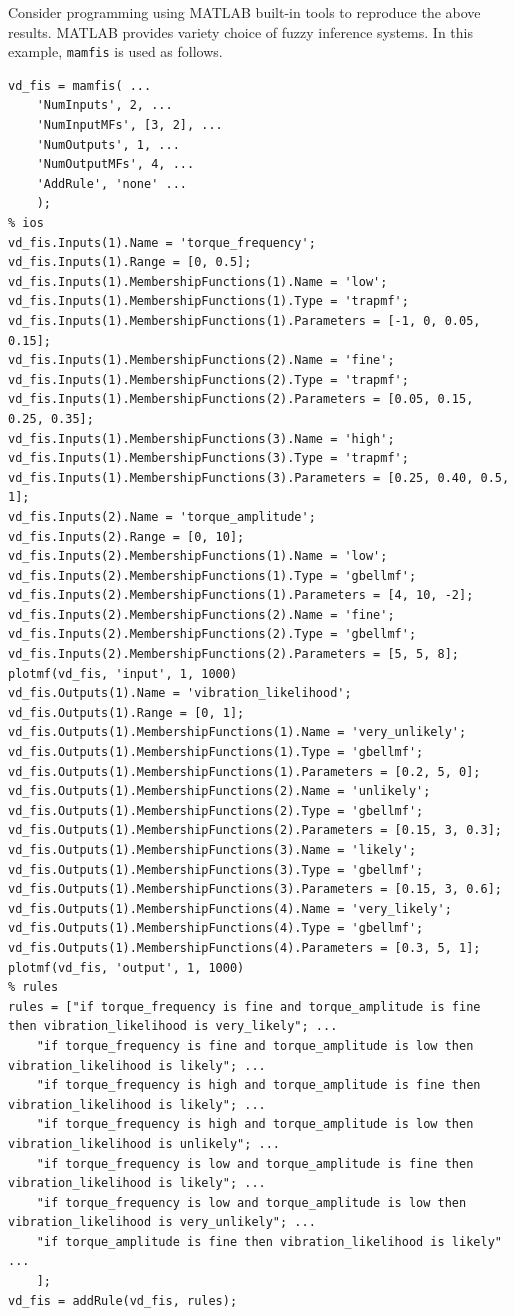 Consider programming using MATLAB built-in tools to reproduce the above results. MATLAB provides variety choice of fuzzy inference systems. In this example, \verb|mamfis| is used as follows.
\begin{lstlisting}
vd_fis = mamfis( ...
	'NumInputs', 2, ...
	'NumInputMFs', [3, 2], ...
	'NumOutputs', 1, ...
	'NumOutputMFs', 4, ...
	'AddRule', 'none' ...
	);
% ios
vd_fis.Inputs(1).Name = 'torque_frequency';
vd_fis.Inputs(1).Range = [0, 0.5];
vd_fis.Inputs(1).MembershipFunctions(1).Name = 'low';
vd_fis.Inputs(1).MembershipFunctions(1).Type = 'trapmf';
vd_fis.Inputs(1).MembershipFunctions(1).Parameters = [-1, 0, 0.05, 0.15];
vd_fis.Inputs(1).MembershipFunctions(2).Name = 'fine';
vd_fis.Inputs(1).MembershipFunctions(2).Type = 'trapmf';
vd_fis.Inputs(1).MembershipFunctions(2).Parameters = [0.05, 0.15, 0.25, 0.35];
vd_fis.Inputs(1).MembershipFunctions(3).Name = 'high';
vd_fis.Inputs(1).MembershipFunctions(3).Type = 'trapmf';
vd_fis.Inputs(1).MembershipFunctions(3).Parameters = [0.25, 0.40, 0.5, 1];
vd_fis.Inputs(2).Name = 'torque_amplitude';
vd_fis.Inputs(2).Range = [0, 10];
vd_fis.Inputs(2).MembershipFunctions(1).Name = 'low';
vd_fis.Inputs(2).MembershipFunctions(1).Type = 'gbellmf';
vd_fis.Inputs(2).MembershipFunctions(1).Parameters = [4, 10, -2];
vd_fis.Inputs(2).MembershipFunctions(2).Name = 'fine';
vd_fis.Inputs(2).MembershipFunctions(2).Type = 'gbellmf';
vd_fis.Inputs(2).MembershipFunctions(2).Parameters = [5, 5, 8];
plotmf(vd_fis, 'input', 1, 1000)
vd_fis.Outputs(1).Name = 'vibration_likelihood';
vd_fis.Outputs(1).Range = [0, 1];
vd_fis.Outputs(1).MembershipFunctions(1).Name = 'very_unlikely';
vd_fis.Outputs(1).MembershipFunctions(1).Type = 'gbellmf';
vd_fis.Outputs(1).MembershipFunctions(1).Parameters = [0.2, 5, 0];
vd_fis.Outputs(1).MembershipFunctions(2).Name = 'unlikely';
vd_fis.Outputs(1).MembershipFunctions(2).Type = 'gbellmf';
vd_fis.Outputs(1).MembershipFunctions(2).Parameters = [0.15, 3, 0.3];
vd_fis.Outputs(1).MembershipFunctions(3).Name = 'likely';
vd_fis.Outputs(1).MembershipFunctions(3).Type = 'gbellmf';
vd_fis.Outputs(1).MembershipFunctions(3).Parameters = [0.15, 3, 0.6];
vd_fis.Outputs(1).MembershipFunctions(4).Name = 'very_likely';
vd_fis.Outputs(1).MembershipFunctions(4).Type = 'gbellmf';
vd_fis.Outputs(1).MembershipFunctions(4).Parameters = [0.3, 5, 1];
plotmf(vd_fis, 'output', 1, 1000)
% rules
rules = ["if torque_frequency is fine and torque_amplitude is fine then vibration_likelihood is very_likely"; ...
	"if torque_frequency is fine and torque_amplitude is low then vibration_likelihood is likely"; ...
	"if torque_frequency is high and torque_amplitude is fine then vibration_likelihood is likely"; ...
	"if torque_frequency is high and torque_amplitude is low then vibration_likelihood is unlikely"; ...
	"if torque_frequency is low and torque_amplitude is fine then vibration_likelihood is likely"; ...
	"if torque_frequency is low and torque_amplitude is low then vibration_likelihood is very_unlikely"; ...
	"if torque_amplitude is fine then vibration_likelihood is likely" ...
	];
vd_fis = addRule(vd_fis, rules);
\end{lstlisting}

